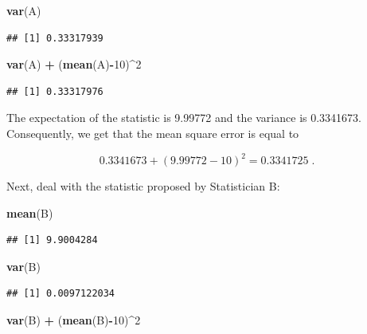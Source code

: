 \documentclass[]{krantz}
\makeatletter
\newenvironment{Shaded}{\begin{snugshade}}{\end{snugshade}}
\newcommand{\DecValTok}[1]{\textcolor[rgb]{0.00,0.00,0.81}{#1}}
\newcommand{\KeywordTok}[1]{\textcolor[rgb]{0.13,0.29,0.53}{\textbf{#1}}}
\newcommand{\NormalTok}[1]{#1}
\newcommand{\OperatorTok}[1]{\textcolor[rgb]{0.81,0.36,0.00}{\textbf{#1}}}
\newcommand{\StringTok}[1]{\textcolor[rgb]{0.31,0.60,0.02}{#1}}
\newenvironment{kframe}{%
\medskip{}
\setlength{\fboxsep}{.8em}
 \def\at@end@of@kframe{}%
 \ifinner\ifhmode%
  \def\at@end@of@kframe{\end{minipage}}%
  \begin{minipage}{\columnwidth}%
 \fi\fi%
 \def\FrameCommand##1{\hskip\@totalleftmargin \hskip-\fboxsep
 \colorbox{shadecolor}{##1}\hskip-\fboxsep
     \hskip-\linewidth \hskip-\@totalleftmargin \hskip\columnwidth}%
 \MakeFramed {\advance\hsize-\width
   \@totalleftmargin\z@ \linewidth\hsize
   \@setminipage}}%
 {\par\unskip\endMakeFramed%
 \at@end@of@kframe}
\renewenvironment{Shaded}{\begin{kframe}}{\end{kframe}}
\theoremstyle{definition}
\theoremstyle{definition}
\theoremstyle{definition}
\theoremstyle{remark}
\makeatother
\begin{document}
\begin{Shaded}
\begin{Highlighting}[]
\KeywordTok{var}\NormalTok{(A)}
\end{Highlighting}
\end{Shaded}

\begin{verbatim}
## [1] 0.33317939
\end{verbatim}

\begin{Shaded}
\begin{Highlighting}[]
\KeywordTok{var}\NormalTok{(A) }\OperatorTok{+}\StringTok{ }\NormalTok{(}\KeywordTok{mean}\NormalTok{(A)}\OperatorTok{-}\DecValTok{10}\NormalTok{)}\OperatorTok{^}\DecValTok{2}
\end{Highlighting}
\end{Shaded}

\begin{verbatim}
## [1] 0.33317976
\end{verbatim}

The expectation of the statistic is 9.99772 and the variance is
0.3341673. Consequently, we get that the mean square error is equal to

\[0.3341673 + (9.99772 - 10)^2 = 0.3341725\;.\]

Next, deal with the statistic proposed by Statistician B:

\begin{Shaded}
\begin{Highlighting}[]
\KeywordTok{mean}\NormalTok{(B)}
\end{Highlighting}
\end{Shaded}

\begin{verbatim}
## [1] 9.9004284
\end{verbatim}

\begin{Shaded}
\begin{Highlighting}[]
\KeywordTok{var}\NormalTok{(B)}
\end{Highlighting}
\end{Shaded}

\begin{verbatim}
## [1] 0.0097122034
\end{verbatim}

\begin{Shaded}
\begin{Highlighting}[]
\KeywordTok{var}\NormalTok{(B) }\OperatorTok{+}\StringTok{ }\NormalTok{(}\KeywordTok{mean}\NormalTok{(B)}\OperatorTok{-}\DecValTok{10}\NormalTok{)}\OperatorTok{^}\DecValTok{2}
\end{Highlighting}
\end{Shaded}
\end{document}
